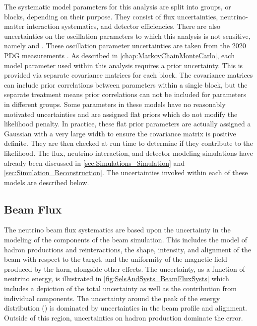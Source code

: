 The systematic model parameters for this analysis are split into groups, or blocks, depending on their purpose. They consist of flux uncertainties, neutrino-matter interaction systematics, and detector efficiencies. There are also uncertainties on the oscillation parameters to which this analysis is not sensitive, namely  and . These oscillation parameter uncertainties are taken from the 2020 PDG measurements \cite{Particle_Data_Group2020-ms}. As described in \autoref{chap:MarkovChainMonteCarlo}, each model parameter used within this analysis requires a prior uncertainty. This is provided via separate covariance matrices for each block. The covariance matrices can include prior correlations between parameters within a single block, but the separate treatment means prior correlations can not be included for parameters in different groups. Some parameters in these models have no reasonably motivated uncertainties and are assigned flat priors which do not modify the likelihood penalty. In practice, these flat prior parameters are actually assigned a Gaussian with a very large width to ensure the covariance matrix is positive definite. They are then checked at run time to determine if they contribute to the likelihood. The flux, neutrino interaction, and detector modeling simulations have already been discussed in \autoref{sec:Simulations_Simulation} and \autoref{sec:Simulation_Reconstruction}. The uncertainties invoked within each of these models are described below.

\subsection{Beam Flux}
\label{sec:SelsAndSysts_Systs_BeamFlux}

The neutrino beam flux systematics are based upon the uncertainty in the modeling of the components of the beam simulation. This includes the model of hadron productions and reinteractions, the shape, intensity, and alignment of the beam with respect to the target, and the uniformity of the magnetic field produced by the horn, alongside other effects. The uncertainty, as a function of neutrino energy, is illustrated in \autoref{fig:SelsAndSysts_BeamFluxSysts} which includes a depiction of the total uncertainty as well as the contribution from individual components. The uncertainty around the peak of the energy distribution () is dominated by uncertainties in the beam profile and alignment. Outside of this region, uncertainties on hadron production dominate the error.

